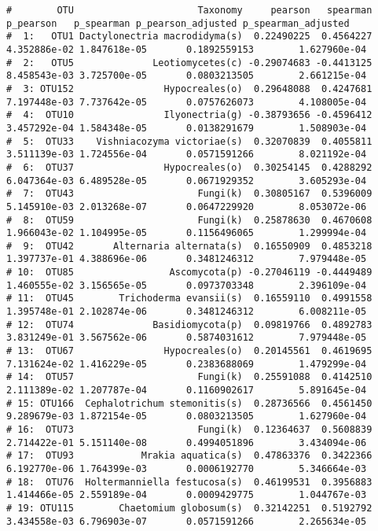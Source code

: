 \documentclass[
]{article}
\begin{document}
\begin{verbatim}
#        OTU                      Taxonomy     pearson   spearman    p_pearson   p_spearman p_pearson_adjusted p_spearman_adjusted
#  1:   OTU1 Dactylonectria macrodidyma(s)  0.22490225  0.4564227 4.352886e-02 1.847618e-05       0.1892559153        1.627960e-04
#  2:   OTU5              Leotiomycetes(c) -0.29074683 -0.4413125 8.458543e-03 3.725700e-05       0.0803213505        2.661215e-04
#  3: OTU152                Hypocreales(o)  0.29648088  0.4247681 7.197448e-03 7.737642e-05       0.0757626073        4.108005e-04
#  4:  OTU10                Ilyonectria(g) -0.38793656 -0.4596412 3.457292e-04 1.584348e-05       0.0138291679        1.508903e-04
#  5:  OTU33    Vishniacozyma victoriae(s)  0.32070839  0.4055811 3.511139e-03 1.724556e-04       0.0571591266        8.021192e-04
#  6:  OTU37                Hypocreales(o)  0.30254145  0.4288292 6.047364e-03 6.489528e-05       0.0671929352        3.605293e-04
#  7:  OTU43                      Fungi(k)  0.30805167  0.5396009 5.145910e-03 2.013268e-07       0.0647229920        8.053072e-06
#  8:  OTU59                      Fungi(k)  0.25878630  0.4670608 1.966043e-02 1.104995e-05       0.1156496065        1.299994e-04
#  9:  OTU42       Alternaria alternata(s)  0.16550909  0.4853218 1.397737e-01 4.388696e-06       0.3481246312        7.979448e-05
# 10:  OTU85                 Ascomycota(p) -0.27046119 -0.4449489 1.460555e-02 3.156565e-05       0.0973703348        2.396109e-04
# 11:  OTU45        Trichoderma evansii(s)  0.16559110  0.4991558 1.395748e-01 2.102874e-06       0.3481246312        6.008211e-05
# 12:  OTU74              Basidiomycota(p)  0.09819766  0.4892783 3.831249e-01 3.567562e-06       0.5874031612        7.979448e-05
# 13:  OTU67                Hypocreales(o)  0.20145561  0.4619695 7.131624e-02 1.416229e-05       0.2383688069        1.479299e-04
# 14:  OTU57                      Fungi(k)  0.25591088  0.4142510 2.111389e-02 1.207787e-04       0.1160902617        5.891645e-04
# 15: OTU166  Cephalotrichum stemonitis(s)  0.28736566  0.4561450 9.289679e-03 1.872154e-05       0.0803213505        1.627960e-04
# 16:  OTU73                      Fungi(k)  0.12364637  0.5608839 2.714422e-01 5.151140e-08       0.4994051896        3.434094e-06
# 17:  OTU93            Mrakia aquatica(s)  0.47863376  0.3422366 6.192770e-06 1.764399e-03       0.0006192770        5.346664e-03
# 18:  OTU76  Holtermanniella festucosa(s)  0.46199531  0.3956883 1.414466e-05 2.559189e-04       0.0009429775        1.044767e-03
# 19: OTU115        Chaetomium globosum(s)  0.32142251  0.5192792 3.434558e-03 6.796903e-07       0.0571591266        2.265634e-05

\end{verbatim}
\end{document}
